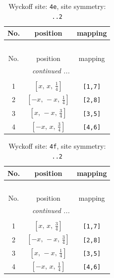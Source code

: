 \documentclass[fleqn,8pt]{jsarticle}
\begin{document}
\begin{longtable}{ccc}
\caption{Wyckoff site: {\tt 4e}, site symmetry: {\tt ..2}}
 \\
 \hline \hline
No. & position & mapping \\ \hline \endfirsthead

\multicolumn{2}{l}{\tablename\ \thetable{}} \\
 \hline \hline
No. & position & mapping \\ \hline \endhead

 \hline \hline
\multicolumn{2}{r}{\footnotesize\it continued ...} \\ \endfoot

 \hline \hline
\multicolumn{2}{r}{} \\ \endlastfoot

1 & $\left[ x,\, x,\, \frac{1}{4} \right]$ & {\tt [1,7]} \\ \hline
2 & $\left[ - x,\, - x,\, \frac{1}{4} \right]$ & {\tt [2,8]} \\ \hline
3 & $\left[ x,\, - x,\, \frac{3}{4} \right]$ & {\tt [3,5]} \\ \hline
4 & $\left[ - x,\, x,\, \frac{3}{4} \right]$ & {\tt [4,6]} \\
\end{longtable}
\renewcommand{\arraystretch}{1.2}
\begin{longtable}{ccc}
\caption{Wyckoff site: {\tt 4f}, site symmetry: {\tt ..2}}
 \\
 \hline \hline
No. & position & mapping \\ \hline \endfirsthead

\multicolumn{2}{l}{\tablename\ \thetable{}} \\
 \hline \hline
No. & position & mapping \\ \hline \endhead

 \hline \hline
\multicolumn{2}{r}{\footnotesize\it continued ...} \\ \endfoot

 \hline \hline
\multicolumn{2}{r}{} \\ \endlastfoot

1 & $\left[ x,\, x,\, \frac{3}{4} \right]$ & {\tt [1,7]} \\ \hline
2 & $\left[ - x,\, - x,\, \frac{3}{4} \right]$ & {\tt [2,8]} \\ \hline
3 & $\left[ x,\, - x,\, \frac{1}{4} \right]$ & {\tt [3,5]} \\ \hline
4 & $\left[ - x,\, x,\, \frac{1}{4} \right]$ & {\tt [4,6]} \\
\end{longtable}
\end{document}
